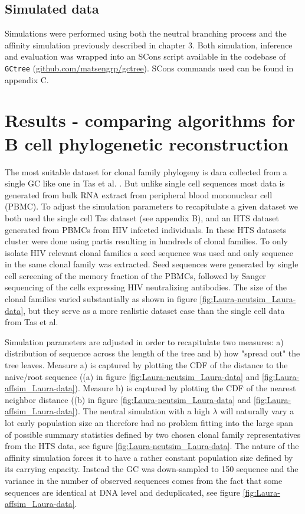 \subsection{Simulated data}
Simulations were performed using both the neutral branching process and the affinity simulation previously described in chapter 3.
Both simulation, inference and evaluation was wrapped into an SCons script \cite{fomel2007reproducible} available in the codebase of \texttt{GCtree} (\url{github.com/matsengrp/gctree}).
SCons commands used can be found in appendix C.





\section{Results - comparing algorithms for B cell phylogenetic reconstruction}
The most suitable dataset for clonal family phylogeny is dara collected from a single GC like one in Tas et al. \cite{tas2016visualizing}.
But unlike single cell sequences most data is generated from bulk RNA extract from peripheral blood mononuclear cell (PBMC).
To adjust the simulation parameters to recapitulate a given dataset we both used the single cell Tas dataset (see appendix B), and an HTS dataset generated from PBMCs from HIV infected individuals.
In these HTS datasets cluster were done using partis resulting in hundreds of clonal families.
To only isolate HIV relevant clonal families a seed sequence was used and only sequence in the same clonal family was extracted.
Seed sequences were generated by single cell screening of the memory fraction of the PBMCs, followed by Sanger sequencing of the cells expressing HIV neutralizing antibodies.
The size of the clonal families varied substantially as shown in figure \ref{fig:Laura-neutsim_Laura-data}, but they serve as a more realistic dataset case than the single cell data from Tas et al.


Simulation parameters are adjusted in order to recapitulate two measures: a) distribution of sequence across the length of the tree and b) how "spread out" the tree leaves.
Measure a) is captured by plotting the CDF of the distance to the naive/root sequence ((a) in figure \ref{fig:Laura-neutsim_Laura-data} and \ref{fig:Laura-affsim_Laura-data}).
Measure b) is captured by plotting the CDF of the nearest neighbor distance ((b) in figure \ref{fig:Laura-neutsim_Laura-data} and \ref{fig:Laura-affsim_Laura-data}).
The neutral simulation with a high $\lambda$ will naturally vary a lot early population size an therefore had no problem fitting into the large span of possible summary statistics defined by two chosen clonal family representatives from the HTS data, see figure \ref{fig:Laura-neutsim_Laura-data}.
The nature of the affinity simulation forces it to have a rather constant population size defined by its carrying capacity.
Instead the GC was down-sampled to 150 sequence and the variance in the number of observed sequences comes from the fact that some sequences are identical at DNA level and deduplicated, see figure \ref{fig:Laura-affsim_Laura-data}.

